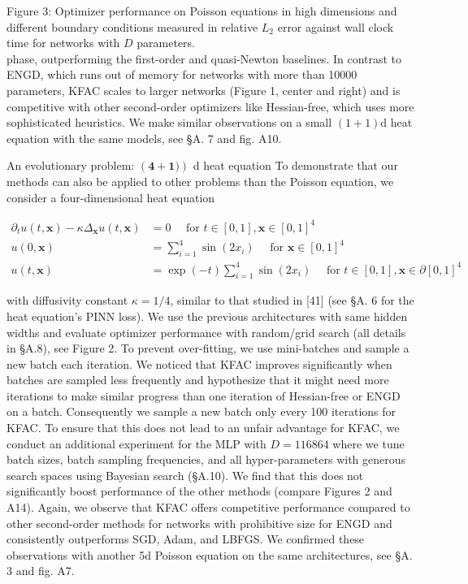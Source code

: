 \documentclass[10pt]{article}
\begin{document}
Figure 3: Optimizer performance on Poisson equations in high dimensions and different boundary conditions measured in relative $L_{2}$ error against wall clock time for networks with $D$ parameters.\\
phase, outperforming the first-order and quasi-Newton baselines. In contrast to ENGD, which runs out of memory for networks with more than 10000 parameters, KFAC scales to larger networks (Figure 1, center and right) and is competitive with other second-order optimizers like Hessian-free, which uses more sophisticated heuristics. We make similar observations on a small $(1+1) \mathrm{d}$ heat equation with the same models, see §A. 7 and fig. A10.

An evolutionary problem: $(\mathbf{4 + 1 )})$ d heat equation To demonstrate that our methods can also be applied to other problems than the Poisson equation, we consider a four-dimensional heat equation


\begin{align*}
\partial_{t} u(t, \boldsymbol{x})-\kappa \Delta_{\boldsymbol{x}} u(t, \boldsymbol{x}) & =0 \quad \text { for } t \in[0,1], \boldsymbol{x} \in[0,1]^{4} \\
u(0, \boldsymbol{x}) & =\sum_{i=1}^{4} \sin \left(2 x_{i}\right) \quad \text { for } \boldsymbol{x} \in[0,1]^{4}  \tag{17}\\
u(t, \boldsymbol{x}) & =\exp (-t) \sum_{i=1}^{4} \sin \left(2 x_{i}\right) \quad \text { for } t \in[0,1], \boldsymbol{x} \in \partial[0,1]^{4}
\end{align*}


with diffusivity constant $\kappa=1 / 4$, similar to that studied in [41] (see §A. 6 for the heat equation's PINN loss). We use the previous architectures with same hidden widths and evaluate optimizer performance with random/grid search (all details in §A.8), see Figure 2. To prevent over-fitting, we use mini-batches and sample a new batch each iteration. We noticed that KFAC improves significantly when batches are sampled less frequently and hypothesize that it might need more iterations to make similar progress than one iteration of Hessian-free or ENGD on a batch. Consequently we sample a new batch only every 100 iterations for KFAC. To ensure that this does not lead to an unfair advantage for KFAC, we conduct an additional experiment for the MLP with $D=116864$ where we tune batch sizes, batch sampling frequencies, and all hyper-parameters with generous search spaces using Bayesian search (§A.10). We find that this does not significantly boost performance of the other methods (compare Figures 2 and A14). Again, we observe that KFAC offers competitive performance compared to other second-order methods for networks with prohibitive size for ENGD and consistently outperforms SGD, Adam, and LBFGS. We confirmed these observations with another 5d Poisson equation on the same architectures, see §A. 3 and fig. A7.
\end{document}

